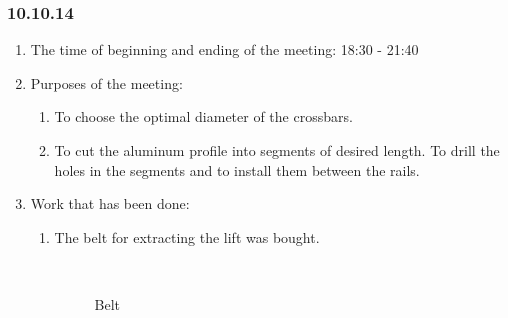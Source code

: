 
\subsubsection{10.10.14}

\begin{enumerate}
	\item The time of beginning and ending of the meeting:
	18:30 - 21:40
	\item Purposes of the meeting:
	\begin{enumerate}
	  \item To choose the optimal diameter of the crossbars.
	  
	  \item To cut the aluminum profile into segments of desired length. To drill the holes in the segments and to install them between the rails.
	  
    \end{enumerate}
	\item Work that has been done:
	\begin{enumerate}
	  \item The belt for extracting the lift was bought.
	  
	  \begin{figure}[H]
	  	\begin{minipage}[h]{0.2\linewidth}
	  		\center  
	  	\end{minipage}
	  	\begin{minipage}[h]{0.6\linewidth}
	  		\caption{Belt}
	  	\end{minipage}
	  \end{figure}
      

\end{enumerate}
\end{enumerate}
